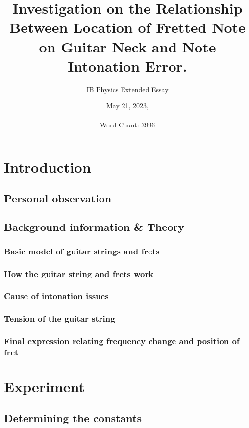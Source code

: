 \documentclass[12pt]{article}
\title{Investigation on the Relationship Between Location of Fretted Note on Guitar Neck and Note Intonation Error.}
\author{IB Physics Extended Essay}
\date{May 21, 2023, \\~\\ \small{Word Count: 3996}}
\begin{document}
    \maketitle
    \newpage
    \tableofcontents
    \newpage
    \begin{flushleft}
        \section{Introduction}
            \subsection{Personal observation}
                
            \subsection{Background information \& Theory}
                \subsubsection*{Basic model of guitar strings and frets}
                    
                \subsubsection*{How the guitar string and frets work}
                    
                \subsubsection*{Cause of intonation issues}
                    
                \subsubsection*{Tension of the guitar string}
                    
                \subsubsection*{Final expression relating frequency change and position of fret}
                    
        \section{Experiment}
            
            \subsection{Determining the constants}
                

\end{flushleft}
\end{document}
